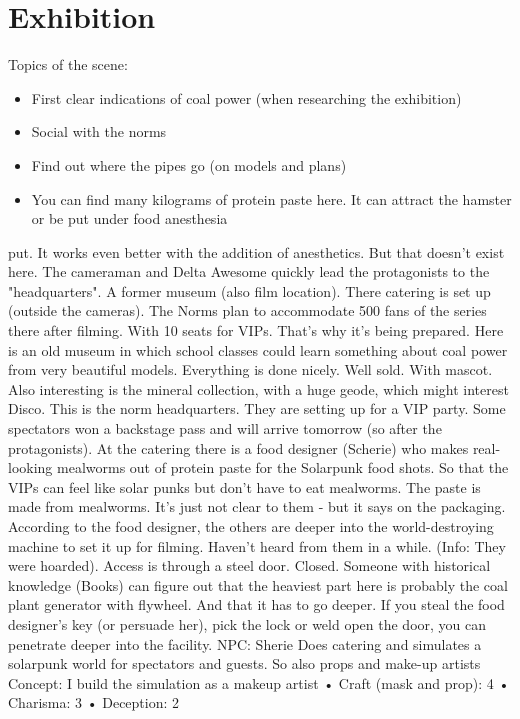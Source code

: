 \section{Exhibition}

Topics of the scene:
\begin{itemize}
\item First clear indications of coal power (when researching the exhibition)
\item Social with the norms
\item Find out where the pipes go (on models and plans)
\item You can find many kilograms of protein paste here. It can attract the hamster or be put under food anesthesia
\end{itemize}
put. It works even better with the addition of anesthetics. But that doesn't exist here.
The cameraman and Delta Awesome quickly lead the protagonists to the "headquarters". A former museum (also film
location). There catering is set up (outside the cameras). The Norms plan to accommodate 500 fans of the series there
after filming. With 10 seats for VIPs. That's why it's being prepared.
Here is an old museum in which school classes could learn something about coal power from very beautiful models.
Everything is done nicely. Well sold. With mascot. Also interesting is the mineral collection, with a huge geode, which might
interest Disco.
This is the norm headquarters. They are setting up for a VIP party. Some spectators won a backstage pass and will arrive
tomorrow (so after the protagonists).
At the catering there is a food designer (Scherie) who makes real-looking mealworms out of protein paste for the Solarpunk
food shots. So that the VIPs can feel like solar punks but don't have to eat mealworms.
The paste is made from mealworms. It's just not clear to them - but it says on the packaging.
According to the food designer, the others are deeper into the world-destroying machine to set it up for filming. Haven't
heard from them in a while. (Info: They were hoarded). Access is through a steel door. Closed.
Someone with historical knowledge (Books) can figure out that the heaviest part here is probably the coal plant generator
with flywheel. And that it has to go deeper.
If you steal the food designer's key (or persuade her), pick the lock or weld open the door, you can penetrate deeper into
the facility.
NPC: Sherie
Does catering and simulates a solarpunk world for spectators and guests. So also props and make-up artists
Concept: I build the simulation as a makeup artist
• Craft (mask and prop): 4
• Charisma: 3
• Deception: 2


